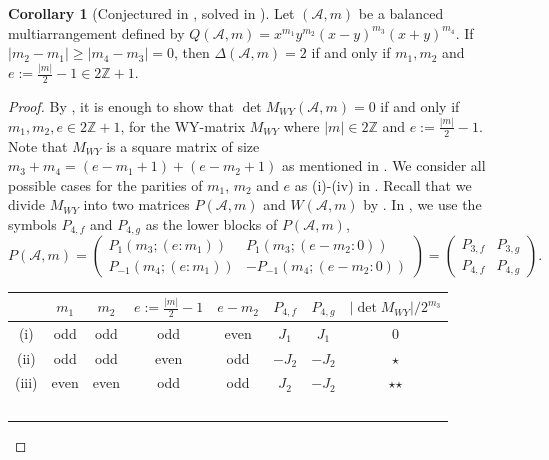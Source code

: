 \documentclass[12pt]{amsart}
\theoremstyle{definition}
\newtheorem{corollary}[definition]{Corollary}
\newcommand{\ZZ}{\mathbb{Z}}
\newcommand{\AAA}{\mathcal{A}}
\begin{document}
\begin{corollary}[Conjectured in \cite{Abe:B_2}, solved in \cite{2312.06356}]
\label{corollary: B_2 exponents in MN}
Let $(\AAA,m)$ be a balanced multiarrangement defined by 
$Q(\AAA,m)=x^{m_1}y^{m_2}(x-y)^{m_3}(x+y)^{m_4}$. 
If $|{m_2}-{m_1}| \geq |{m_4}-{m_3}|= 0$, then $\Delta(\AAA,m)=2$ 
if and only if ${m_1},{m_2}$ and $e:=\frac{|m|}{2}-1\in2\ZZ+1$. 
\end{corollary}

\begin{proof}
By , 
it is enough 
to show that $\det M_{WY}(\AAA,m)=0$ if and only if 
${m_1},{m_2},e\in2\ZZ+1$, 
for the WY-matrix $M_{WY}$ where $|m|\in2\ZZ$ and $e:=\frac{|m|}{2}-1$. 
Note that $M_{WY}$ is a square matrix of size $m_3+m_4=(e-m_1+1)+(e-m_2+1)$ 
as mentioned in .
We consider all possible cases for the parities %
of $m_1$, $m_2$ and $e$ as (i)-(iv) in .
Recall that we divide $M_{WY}$ into two matrices $P(\AAA,m)$ and $W(\AAA,m)$ 
by . 
%
In , 
we use the symbols $P_{4,f}$ and $P_{4,g}$ as the lower blocks of $P(\AAA,m)$, 
\[
{P}(\AAA,m)=
\left(
\begin{array}{c|c}
 P_{1}(m_3;(e:m_1)) & P_{1}(m_3;(e-m_2:0)) \\
\hline%
 P_{-1}(m_4;(e:m_1)) & -P_{-1}(m_4;(e-m_2:0)) 
\end{array}
\right)
=
\left(
\begin{array}{c|c}
 P_{3,f} & P_{3,g} \\
\hline%
 P_{4,f} & P_{4,g} 
\end{array}
\right).
\]
%
\begin{table}[h]
\centering
\begin{tabular}{|c||c|c|c||c||c|c||c|}\hline
& $m_1$ & $m_2$ & $e:=\frac{|m|}{2}-1$ & $e-m_2$ 
& $P_{4,f}$ & $P_{4,g}$ & $|\det M_{WY}|/2^{m_3}$\\ \hline\hline
  (i) &  odd &  odd &  odd & even & $ J_1$ & $ J_1$ & 0 \\ \hline
 (ii) &  odd &  odd & even &  odd & $-J_2$ & $-J_2$ & $\star$ \\ \hline
(iii) & even & even &  odd &  odd & $ J_2$ & $-J_2$ & $\star$$\star$ \\ \hline
$$
\end{tabular}
\end{table}
\end{proof}
\end{document}
